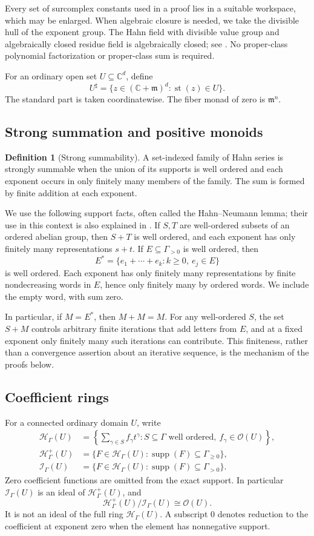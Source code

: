 \documentclass[11pt,oneside]{article}
\numberwithin{equation}{section}
\theoremstyle{definition}
\newtheorem{definition}[theorem]{Definition}
\theoremstyle{remark}\newtheorem{remark}[theorem]{Remark}
\newcommand{\C}{\mathbb C}
\newcommand{\OO}{\mathcal O}
\newcommand{\HH}{\mathcal H_{\Gamma}}
\newcommand{\Hp}{\mathcal H^{+}_{\Gamma}}
\newcommand{\Ip}{\mathcal I_{\Gamma}}
\newcommand{\mm}{\mathfrak m}
\newcommand{\sh}{^{\sharp}}
\newcommand{\supp}{\operatorname{supp}}
\newcommand{\st}{\operatorname{st}}
\begin{document}
Every set of surcomplex constants used in a proof lies in a suitable workspace, which may be enlarged. When algebraic closure is needed, we take the divisible hull of the exponent group. The Hahn field with divisible value group and algebraically closed residue field is algebraically closed; see \cite[Corollary 4]{Poonen}. No proper-class polynomial factorization or proper-class sum is required.

For an ordinary open set \(U\subseteq\C^d\), define
\[
 U\sh=\{z\in(\C+\mm)^d:\st(z)\in U\}.
\]
The standard part is taken coordinatewise. The fiber monad of zero is \(\mm^n\).

\subsection{Strong summation and positive monoids}
\begin{definition}[Strong summability]
A set-indexed family of Hahn series is strongly summable when the union of its supports is well ordered and each exponent occurs in only finitely many members of the family. The sum is formed by finite addition at each exponent.
\end{definition}

We use the following support facts, often called the Hahn--Neumann lemma; their use in this context is also explained in \cite{Source,Poonen}. If \(S,T\) are well-ordered subsets of an ordered abelian group, then \(S+T\) is well ordered, and each exponent has only finitely many representations \(s+t\). If \(E\subseteq\Gamma_{>0}\) is well ordered, then
\[
 E^*=\{e_1+\cdots+e_k:k\geq0,\ e_j\in E\}
\]
is well ordered. Each exponent has only finitely many representations by finite nondecreasing words in \(E\), hence only finitely many by ordered words. We include the empty word, with sum zero.

In particular, if \(M=E^*\), then \(M+M=M\). For any well-ordered \(S\), the set \(S+M\) controls arbitrary finite iterations that add letters from \(E\), and at a fixed exponent only finitely many such iterations can contribute. This finiteness, rather than a convergence assertion about an iterative sequence, is the mechanism of the proofs below.

\subsection{Coefficient rings}
For a connected ordinary domain \(U\), write
\begin{align*}
 \HH(U)&=\left\{\sum_{\gamma\in S}f_\gamma t^\gamma:
 S\subseteq\Gamma\text{ well ordered},\ f_\gamma\in\OO(U)\right\},\\
 \Hp(U)&=\{F\in\HH(U):\supp(F)\subseteq\Gamma_{\geq0}\},\\
 \Ip(U)&=\{F\in\HH(U):\supp(F)\subseteq\Gamma_{>0}\}.
\end{align*}
Zero coefficient functions are omitted from the exact support. In particular \(\Ip(U)\) is an ideal of \(\Hp(U)\), and
\[
 \Hp(U)/\Ip(U)\cong\OO(U).
\]
It is not an ideal of the full ring \(\HH(U)\). A subscript \(0\) denotes reduction to the coefficient at exponent zero when the element has nonnegative support.
\end{document}
